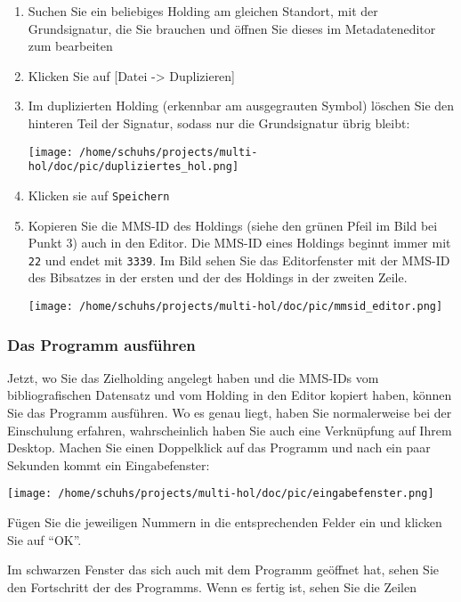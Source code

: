 \documentclass[10pt, a4paper]{scrartcl}
\begin{document}
\begin{enumerate}
\item Suchen Sie ein beliebiges Holding am gleichen Standort, mit der
Grundsignatur, die Sie brauchen und öffnen Sie dieses im Metadateneditor
zum bearbeiten
\item Klicken Sie auf [Datei -> Duplizieren]
\item Im duplizierten Holding (erkennbar am ausgegrauten Symbol) löschen Sie
den hinteren Teil der Signatur, sodass nur die Grundsignatur übrig bleibt:

\begin{center}
\texttt{[image: /home/schuhs/projects/multi-hol/doc/pic/dupliziertes\_hol.png]}
\end{center}
\item Klicken sie auf \texttt{Speichern}
\item Kopieren Sie die MMS-ID des Holdings (siehe den grünen Pfeil im Bild bei
Punkt 3) auch in den Editor. Die MMS-ID eines Holdings beginnt immer
mit \texttt{22} und endet mit \texttt{3339}. Im Bild sehen Sie das Editorfenster mit
der MMS-ID des Bibsatzes in der ersten und der des Holdings in der
zweiten Zeile.

\begin{center}
\texttt{[image: /home/schuhs/projects/multi-hol/doc/pic/mmsid\_editor.png]}
\end{center}
\end{enumerate}
\subsubsection{Das Programm ausführen}
\label{sec:orgaa2b7b1}
Jetzt, wo Sie das Zielholding angelegt haben und die MMS-IDs vom
bibliografischen Datensatz und vom Holding in den Editor kopiert haben,
können Sie das Programm ausführen. Wo es genau liegt, haben Sie
normalerweise bei der Einschulung erfahren, wahrscheinlich haben Sie auch
eine Verknüpfung auf Ihrem Desktop. Machen Sie einen Doppelklick auf das
Programm und nach ein paar Sekunden kommt ein Eingabefenster:

\begin{center}
\texttt{[image: /home/schuhs/projects/multi-hol/doc/pic/eingabefenster.png]}
\end{center}

Fügen Sie die jeweiligen Nummern in die entsprechenden Felder ein und
klicken Sie auf "`OK"'.

Im schwarzen Fenster das sich auch mit dem Programm geöffnet hat, sehen
Sie den Fortschritt der des Programms. Wenn es fertig ist, sehen Sie die
Zeilen
\end{document}
